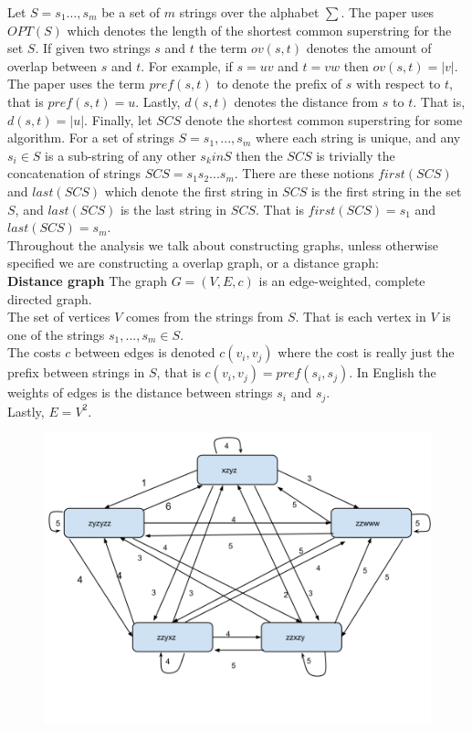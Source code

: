 \documentclass[letterpaper,11pt,titlepage]{article}
\begin{document}
Let $S = {s_1 \ldots, s_m}$ be a set of $m$ strings over the alphabet $\sum$. The paper uses $OPT(S)$ which denotes the length of the shortest common superstring for the set $S$. If given two strings $s$ and $t$ the term $ov(s,t)$ denotes the amount of overlap between $s$ and $t$. For example, if $s = uv$ and $t = vw$ then $ov(s,t) = |v|$. The paper uses the term $pref(s,t)$ to denote the prefix of $s$ with respect to $t$, that is $pref(s,t) = u$. Lastly, $d(s,t)$ denotes the distance from $s$ to $t$. That is, $d(s,t) = |u|$. Finally, let $SCS$ denote the shortest common superstring for some algorithm. For a set of strings $S = {s_1, ..., s_m}$ where each string is unique, and any $s_i \in S$ is a sub-string of any other $s_k in S$ then the $SCS$ is trivially the concatenation of strings $SCS = s_1s_2...s_m$. There are these notions $first(SCS)$ and $last(SCS)$ which denote the first string in $SCS$ is the first string in the set $S$, and $last(SCS)$ is the last string in $SCS$. That is $first(SCS) = s_1$ and $last(SCS) = s_m$. \\

\newpage
Throughout the analysis we talk about constructing graphs, unless otherwise specified we are constructing a overlap graph, or a distance graph:\\

\textbf{Distance graph}
The graph $G = (V,E,c)$ is an edge-weighted, complete directed graph. \\
The set of vertices $V$ comes from the strings from $S$. That is each vertex in $V$ is one of the strings $s_1, ..., s_m \in S$.\\
The costs $c$ between edges is denoted $c(v_i,v_j)$ where the cost is really just the prefix between strings in $S$, that is $c(v_i,v_j) = pref(s_i,s_j)$. In English the weights of edges is the distance between strings $s_i$ and $s_j$.\\
Lastly, $E=V^2$.\\

\begin{figure}[h]
 \centering
   \includegraphics[width=.6\textwidth]{distance.png}
\end{figure}
\end{document}
